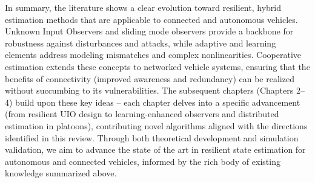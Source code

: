 In summary, the literature shows a clear evolution toward resilient, hybrid estimation methods that are applicable to connected and autonomous vehicles. Unknown Input Observers and sliding mode observers provide a backbone for robustness against disturbances and attacks, while adaptive and learning elements address modeling mismatches and complex nonlinearities. Cooperative estimation extends these concepts to networked vehicle systems, ensuring that the benefits of connectivity (improved awareness and redundancy) can be realized without succumbing to its vulnerabilities. The subsequent chapters (Chapters 2–4) build upon these key ideas – each chapter delves into a specific advancement (from resilient UIO design to learning-enhanced observers and distributed estimation in platoons), contributing novel algorithms aligned with the directions identified in this review. Through both theoretical development and simulation validation, we aim to advance the state of the art in resilient state estimation for autonomous and connected vehicles, informed by the rich body of existing knowledge summarized above.






